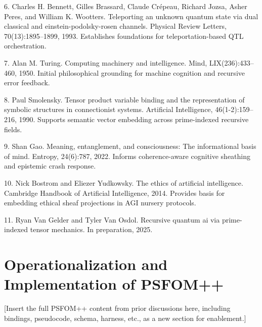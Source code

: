 \documentclass[11pt]{article}
\begin{document}
6. Charles H. Bennett, Gilles Brassard, Claude Cr\'epeau, Richard Jozsa, Asher Peres, and William K. Wootters. Teleporting an unknown quantum state via dual classical and einstein-podolsky-rosen channels. Physical Review Letters, 70(13):1895–1899, 1993. Establishes foundations for teleportation-based QTL orchestration.

7. Alan M. Turing. Computing machinery and intelligence. Mind, LIX(236):433–460, 1950. Initial philosophical grounding for machine cognition and recursive error feedback.

8. Paul Smolensky. Tensor product variable binding and the representation of symbolic structures in connectionist systems. Artificial Intelligence, 46(1-2):159–216, 1990. Supports semantic vector embedding across prime-indexed recursive fields.

9. Shan Gao. Meaning, entanglement, and consciousness: The informational basis of mind. Entropy, 24(6):787, 2022. Informs coherence-aware cognitive sheathing and epistemic crash response.

10. Nick Bostrom and Eliezer Yudkowsky. The ethics of artificial intelligence. Cambridge Handbook of Artificial Intelligence, 2014. Provides basis for embedding ethical sheaf projections in AGI nursery protocols.

11. Ryan Van Gelder and Tyler Van Osdol. Recursive quantum ai via prime-indexed tensor mechanics. In preparation, 2025.

\section{Operationalization and Implementation of PSFOM++}
[Insert the full PSFOM++ content from prior discussions here, including bindings, pseudocode, schema, harness, etc., as a new section for enablement.]
\end{document}
